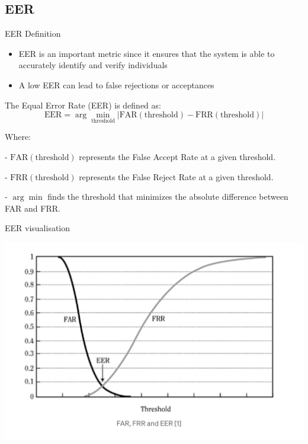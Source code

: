 \documentclass[hyperref={pdfpagelabels=false}, color=table]{beamer}
\begin{document}
    \subsection{EER}
    \begin{frame}{EER Definition}
        \begin{itemize}
            \item EER is an important metric since it ensures that the system is able to accurately identify and verify individuals
            \item A low EER can lead to false rejections or acceptances
        \end{itemize}

        \begin{block}{The Equal Error Rate (EER) is defined as:}
        \[
            \text{EER} = \arg\min_{\text{threshold}} \left| \text{FAR}(\text{threshold}) - \text{FRR}(\text{threshold}) \right|
        \]
        \end{block}
        \small
        Where:

        - $\text{FAR}(\text{threshold})$ represents the False Accept Rate at a given threshold.

        - $\text{FRR}(\text{threshold})$ represents the False Reject Rate at a given threshold.

        - $\arg\min$ finds the threshold that minimizes the absolute difference between FAR and FRR.
        \normalsize
    \end{frame}
    \begin{frame}{EER visualisation}
        \begin{center}
        \includegraphics[scale=.5]{images/eer}
            \end{center}
    \end{frame}
\end{document}
